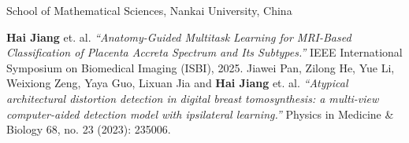 \documentclass[10pt,a4paper,final]{moderncv}
\begin{document}
	{}{}{School of Mathematical Sciences, Nankai University, China}
\nocite{*}

	\begin{thebibliography}{99}
		\bibitem[1]{} 
					\textbf{Hai Jiang} et. al. 
					\emph{``Anatomy-Guided Multitask Learning for MRI-Based Classification of Placenta Accreta Spectrum and Its Subtypes.''} 
					IEEE International Symposium on Biomedical Imaging (ISBI), 2025.
		\bibitem[2]{} 
					Jiawei Pan, Zilong He, Yue Li, Weixiong Zeng, Yaya Guo, Lixuan Jia and \textbf{Hai Jiang} et. al. 
					\emph{``Atypical architectural distortion detection in digital breast tomosynthesis: a multi-view computer-aided detection model with ipsilateral learning.''} 
					Physics in Medicine \& Biology 68, no. 23 (2023): 235006.
	\end{thebibliography}
\end{document}
